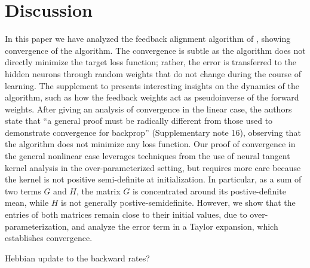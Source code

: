 \section{Discussion}

In this paper we have analyzed the feedback alignment algorithm of
\cite{lillicrap2016random}, showing convergence of the algorithm. The convergence is subtle as the algorithm does not directly minimize the target loss function; rather, the error is transferred to the hidden neurons through random weights that do not change during the course of learning.
The supplement to \cite{lillicrap2016random} presents interesting insights on the dynamics of the algorithm, such as how the feedback weights act as pseudoinverse of the forward weights. After giving an analysis of convergence in the linear case, the authors state that
``a general proof must be radically different from those used to demonstrate convergence for backprop'' (Supplementary note 16), observing that the algorithm does not minimize any loss function. Our proof of convergence in the general nonlinear case leverages techniques from
the use of neural tangent kernel analysis in the over-parameterized setting, but requires more care because the kernel is not positive semi-definite at initialization. In particular, as a sum of two terms $G$ and $H$, the matrix $G$ is concentrated around its postive-definite mean, while $H$ is not generally postive-semidefinite. However, we show that the entries of both matrices remain close to their initial values, due to over-parameterization, and analyze the error term in a Taylor expansion, which establishes convergence.


Hebbian update to the backward rates?
